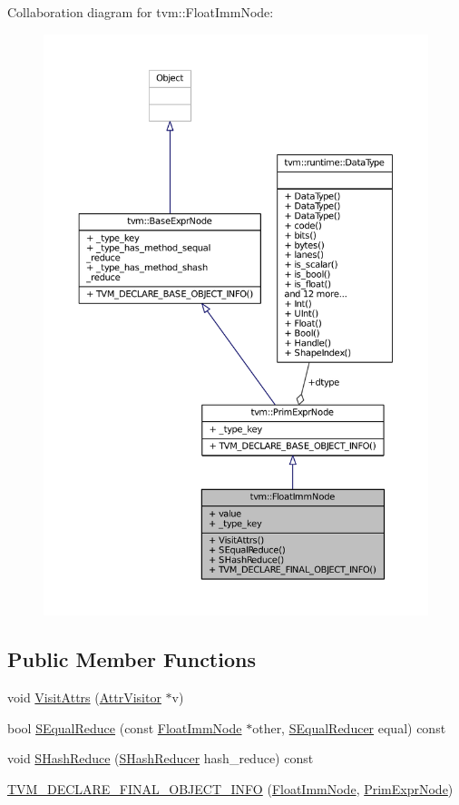 Collaboration diagram for tvm\+:\+:Float\+Imm\+Node\+:
\nopagebreak
\begin{figure}[H]
\begin{center}
\leavevmode
\includegraphics[width=350pt]{classtvm_1_1FloatImmNode__coll__graph}
\end{center}
\end{figure}
\subsection*{Public Member Functions}
\begin{DoxyCompactItemize}
\item 
void \hyperlink{classtvm_1_1FloatImmNode_a74569b541c1056734fff07a23a05558e}{Visit\+Attrs} (\hyperlink{classtvm_1_1AttrVisitor}{Attr\+Visitor} $\ast$v)
\item 
bool \hyperlink{classtvm_1_1FloatImmNode_a13156b7fe5e11835246b157987031b7b}{S\+Equal\+Reduce} (const \hyperlink{classtvm_1_1FloatImmNode}{Float\+Imm\+Node} $\ast$other, \hyperlink{classtvm_1_1SEqualReducer}{S\+Equal\+Reducer} equal) const 
\item 
void \hyperlink{classtvm_1_1FloatImmNode_a7974ef908deb8bcc00e46aa9e0d989b5}{S\+Hash\+Reduce} (\hyperlink{classtvm_1_1SHashReducer}{S\+Hash\+Reducer} hash\+\_\+reduce) const 
\item 
\hyperlink{classtvm_1_1FloatImmNode_a3a946ff538b4eb2a18c6ca30ae2da881}{T\+V\+M\+\_\+\+D\+E\+C\+L\+A\+R\+E\+\_\+\+F\+I\+N\+A\+L\+\_\+\+O\+B\+J\+E\+C\+T\+\_\+\+I\+N\+FO} (\hyperlink{classtvm_1_1FloatImmNode}{Float\+Imm\+Node}, \hyperlink{classtvm_1_1PrimExprNode}{Prim\+Expr\+Node})
\end{DoxyCompactItemize}

